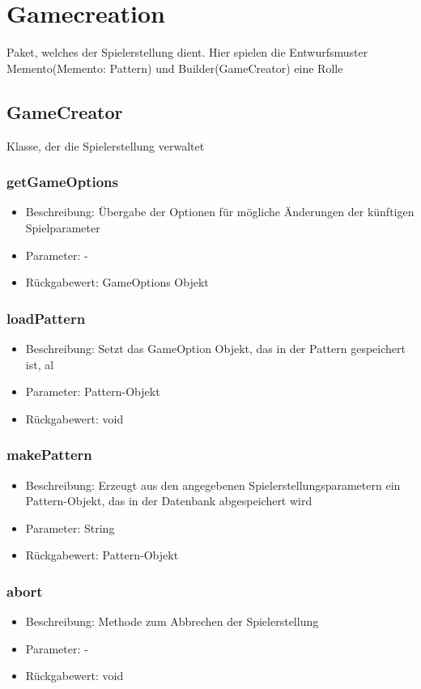 \documentclass[a4paper]{scrreprt}
\begin{document}
	\section{Gamecreation}
	Paket, welches der Spielerstellung dient. Hier spielen die Entwurfsmuster Memento(Memento: Pattern) und Builder(GameCreator) eine Rolle
	\subsection{GameCreator}
	Klasse, der die Spielerstellung verwaltet
	\subsubsection{getGameOptions}
	\begin{itemize}
		\item Beschreibung: Übergabe der Optionen für mögliche Änderungen der künftigen Spielparameter
		\item Parameter: -
		\item Rückgabewert: GameOptions Objekt
	\end{itemize}
	\subsubsection{loadPattern}
	\begin{itemize}
		\item Beschreibung: Setzt das GameOption Objekt, das in der Pattern gespeichert ist, al
		\item Parameter: Pattern-Objekt
		\item Rückgabewert: void
	\end{itemize}
	\subsubsection{makePattern}
	\begin{itemize}
		\item Beschreibung: Erzeugt aus den angegebenen Spielerstellungsparametern ein Pattern-Objekt, das in der Datenbank abgespeichert wird
		\item Parameter: String
		\item Rückgabewert: Pattern-Objekt
	\end{itemize}
	\subsubsection{abort}
	\begin{itemize}
		\item Beschreibung: Methode zum Abbrechen der Spielerstellung
		\item Parameter: -
		\item Rückgabewert: void
	\end{itemize}
\end{document}
